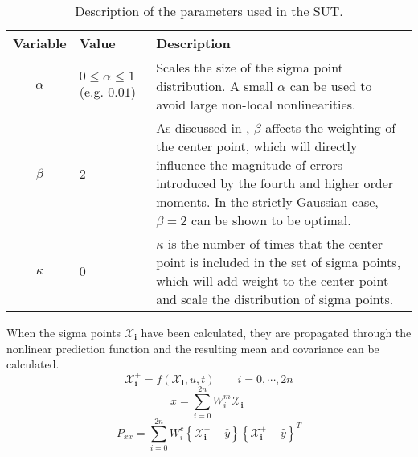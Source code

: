     \begin{table}
        \begin{tabularx}{\tablewidth}{c|p{2cm}X}
            \textbf{Variable} & \textbf{Value} & \textbf{Description} \\ \hline
            $\alpha$ & $0 \leq \alpha \leq 1$ (e.g. $0.01$) & Scales the size of the sigma point distribution.
                                                A small $\alpha$ can be used to avoid large non-local nonlinearities. \\
            $\beta$  & $2$ &  As discussed in \citep{Julier02thescaled}, $\beta$ affects the weighting of the center point,
                            which will directly influence the magnitude of errors introduced by the fourth and higher
                            order moments. In the strictly Gaussian case, $\beta = 2$ can be shown to be optimal. \\
            $\kappa$ & $0$ &  $\kappa$ is the number of times that the center point is included in the set of sigma points,
                            which will add weight to the center point and scale the distribution of sigma points. \\
        \end{tabularx}
        \label{tbl:observer:ukf::parameters}
        \caption{Description of the parameters used in the SUT.}
    \end{table}

    When the sigma points $\mathbf{\mathcal{X}_{i}}$ have been calculated,
    they are propagated through the nonlinear prediction function and
    the resulting mean and covariance can be calculated.
    \begin{equation}
        \mathbf{\mathcal{X}^{+}_{i}} = f(\mathbf{\mathcal{X}_{i}}, u, t) \qquad i = 0,\cdots,2n
    \end{equation}
    \begin{equation}
        \hat{x} = \sum_{i=0}^{2n}W^{m}_{i}\mathbf{\mathcal{X}^{+}_{i}}
    \end{equation}
    \begin{equation}
        P_{xx} = \sum_{i=0}^{2n}W^{c}_{i}
            \left\lbrace \mathbf{\mathcal{X}^{+}_{i}} - \hat{y} \right\rbrace
            \left\lbrace \mathbf{\mathcal{X}^{+}_{i}} - \hat{y} \right\rbrace^{T}
    \end{equation}

